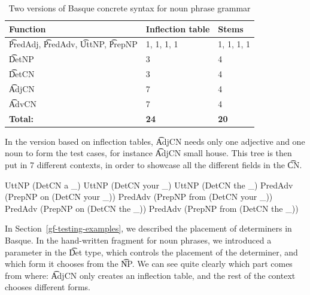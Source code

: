 \begin{table}[h]

\centering
\begin{tabular}{| p{2.3cm} | l | l |}
\hline
{\bf Function} & {\bf Inflection table}
   & {\bf Stems} \\ \hline

\t{PredAdj}, \t{PredAdv}, \t{UttNP}, \t{PrepNP}  & 1, 1, 1, 1 & 1, 1,
                                                                1, 1
  \\ \hline
\t{DetNP}    & 3 & 4   \\ \hline
\t{DetCN}    & 3 & 4   \\ \hline
\t{AdjCN}    & 7 & 4   \\ \hline
\t{AdvCN}    & 7 & 4   \\ \hline
{\bf Total:} & {\bf 24} & {\bf 20} \\
\hline
\end{tabular}
\caption{Two versions of Basque concrete syntax for noun phrase grammar}
\label{basque_versions}
\end{table}

In the version based on inflection tables, \t{AdjCN} needs only one
adjective and one noun to form the test cases, for instance \t{AdjCN
  small house}.
This tree is then put in 7 different contexts, in order to showcase
all the different fields in the \t{CN}.

\begin{EmptyItem}
\begin{Highlighting}[]
UttNP (DetCN a _)
UttNP (DetCN your _)
UttNP (DetCN the _)
PredAdv  (PrepNP on (DetCN your _))
PredAdv  (PrepNP from (DetCN your _))
PredAdv  (PrepNP on (DetCN the _))
PredAdv  (PrepNP from (DetCN the _))
\end{Highlighting}
\end{EmptyItem}

\noindent In Section~\ref{gf-testing-examples}, we described the
placement of determiners in Basque. In the hand-written fragment for
noun phrases, we introduced a parameter in the \t{Det} type, which
controls the placement of the determiner, and which form it chooses
from the \t{NP}. We can see quite clearly which part comes from where:
\t{AdjCN} only creates an inflection table, and the rest of the
context chooses different forms.


